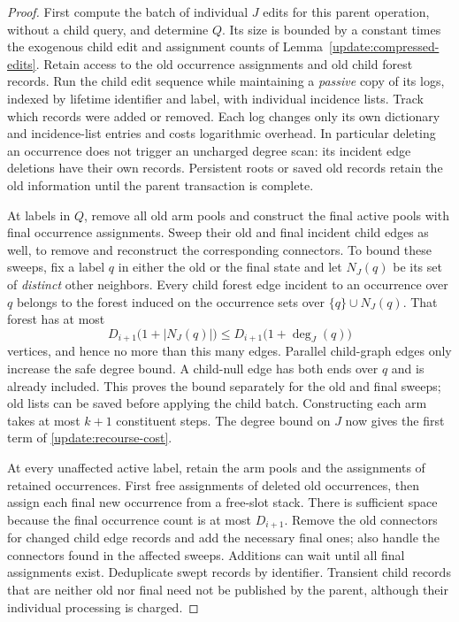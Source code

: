 \begin{proof}
First compute the batch of individual $J$ edits for this parent
operation, without a child query, and determine $Q$.  Its size is
bounded by a constant times the exogenous child edit and
assignment counts of Lemma~\ref{update:compressed-edits}.  Retain
access to the old occurrence assignments and old child forest
records.  Run the child edit sequence while maintaining a
\emph{passive} copy of its logs, indexed by lifetime identifier and
label, with individual incidence lists.  Track which records were
added or removed.  Each log changes only its own dictionary and
incidence-list entries and costs logarithmic overhead.  In
particular deleting an occurrence does not trigger an uncharged
degree scan: its incident edge deletions have their own records.
Persistent roots or saved old records retain the old information
until the parent transaction is complete.

At labels in $Q$, remove all old arm pools and construct the final
active pools with final occurrence assignments.  Sweep their old
and final incident child edges as well, to remove and reconstruct
the corresponding connectors.  To bound these sweeps, fix a label
$q$ in either the old or the final state and let $N_J(q)$ be its
set of \emph{distinct} other neighbors.  Every child forest edge
incident to an occurrence over $q$ belongs to the forest induced
on the occurrence sets over $\{q\}\cup N_J(q)$.  That forest has
at most
\begin{equation}
 D_{i+1}\bigl(1+|N_J(q)|\bigr)
       \le D_{i+1}\bigl(1+\deg_J(q)\bigr)
 \label{update:incident-forest-count}
\end{equation}
vertices, and hence no more than this many edges.  Parallel
child-graph edges only increase the safe degree bound.  A
child-null edge has both ends over $q$ and is already included.
This proves the bound separately for the old and final sweeps;
old lists can be saved before applying the child batch.
Constructing each arm takes at most $k+1$ constituent steps.
The degree bound on $J$ now gives the first term of
\eqref{update:recourse-cost}.

At every unaffected active label, retain the arm pools and the
assignments of retained occurrences.  First free assignments of
deleted old occurrences, then assign each final new occurrence
from a free-slot stack.  There is sufficient space because the
final occurrence count is at most $D_{i+1}$.  Remove the old
connectors for changed child edge records and add the necessary
final ones; also handle the connectors found in the affected
sweeps.  Additions can wait until all final assignments exist.
Deduplicate swept records by identifier.  Transient child records
that are neither old nor final need not be published by the parent,
although their individual processing is charged.


\end{proof}
